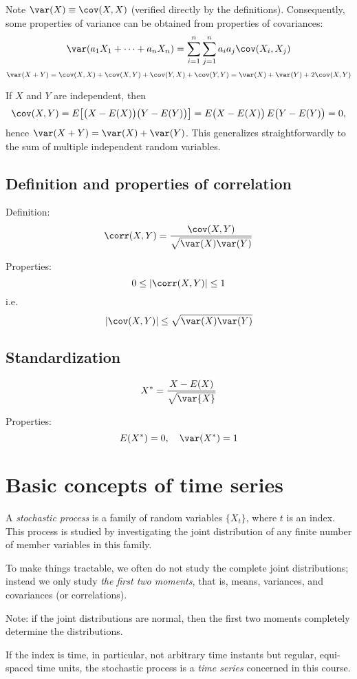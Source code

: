 \documentclass[12pt]{article}
\begin{document}
Note $\var(X) \equiv \cov(X,X)$ (verified directly by the definitions).
Consequently, some properties of variance can be obtained from
properties of covariances:
\[
\var(a_1X_1 +\dotsb+ a_nX_n)
= \sum_{i=1}^n\sum_{j=1}^n a_ia_j \cov(X_i,X_j)
\]
\[
\var(X+Y)
= \cov(X,X) + \cov(X,Y) + \cov(Y,X) + \cov(Y,Y)
= \var(X) + \var(Y) + 2\cov(X,Y)
\]

If $X$ and $Y$ are independent, then
\[
\cov(X,Y)
= E\bigl[\bigl(X-E(X)\bigr) \bigl(Y-E(Y)\bigr)\bigr]
= E\bigl(X-E(X)\bigr) \, E\bigl(Y-E(Y)\bigr)
= 0,
\]
hence $\var(X+Y) = \var(X) + \var(Y)$.
This generalizes straightforwardly to the sum of multiple independent
random variables.

\subsection{Definition and properties of correlation}

Definition:
\[
\corr(X,Y) = \frac{\cov(X,Y)}{\sqrt{\var(X)\var(Y)}}
\]

Properties:
\[
0 \le \lvert\corr(X,Y)\rvert \le 1
\]
i.e.
\[
\lvert\cov(X,Y)\rvert
\le \sqrt{\var(X)\var(Y)}
\]

\subsection{Standardization}

\[
X^* = \frac{X - E(X)}{\sqrt{\var{X}}}
\]

Properties:
\[
E(X^*) = 0,\quad
\var(X^*) = 1
\]

\section{Basic concepts of time series}

A \emph{stochastic process} is a family of random variables
$\{X_t\}$, where $t$ is an index.
This process is studied by investigating the joint distribution
of any finite number of member variables in this family.

To make things tractable,
we often do not study the complete joint distributions;
instead we only study \emph{the first two moments}, that is,
means, variances, and covariances (or correlations).

Note: if the joint distributions are normal,
then the first two moments completely determine the distributions.

If the index is time, in particular, not arbitrary time instants but
regular, equi-spaced time units,
the stochastic process is a \emph{time series} concerned in this course.
\end{document}
